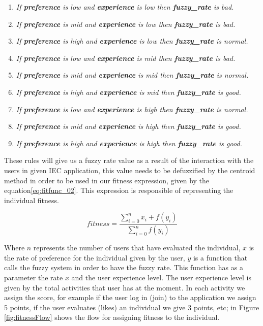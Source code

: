 \begin{enumerate}
	\item \textit{If \textbf{preference} is low and
		\textbf{experience} is low then \textbf{fuzzy\_rate} is bad.}
	\item \textit{If \textbf{preference} is mid and
		\textbf{experience} is low then \textbf{fuzzy\_rate} is bad.}
	\item \textit{If \textbf{preference} is high and
		\textbf{experience} is low then \textbf{fuzzy\_rate} is normal.}
	\item \textit{If \textbf{preference} is low and
		\textbf{experience} is mid then \textbf{fuzzy\_rate} is bad.}
	\item \textit{If \textbf{preference} is mid and
		\textbf{experience} is mid then \textbf{fuzzy\_rate} is normal.}
	\item \textit{If \textbf{preference} is high and
		\textbf{experience} is mid then \textbf{fuzzy\_rate} is good.}
	\item \textit{If \textbf{preference} is low and
		\textbf{experience} is high then \textbf{fuzzy\_rate} is normal.}
	\item \textit{If \textbf{preference} is mid and
		\textbf{experience} is high then \textbf{fuzzy\_rate} is good.}
	\item \textit{If \textbf{preference} is high and
		\textbf{experience} is high then \textbf{fuzzy\_rate} is good.}

\end{enumerate}

These rules will give us a fuzzy rate value as a result of the interaction with
the users in given IEC application, this value needs to be defuzzified by the
centroid method in order to be used in our fitness expression, given by the
equation\ref{eq:fitfunc_02}. This expression is responsible of representing the
individual fitness.

\begin{equation}\label{eq:fitfunc_02}
\displaystyle fitness=\frac{\sum_{i=0}^{n}x_{i}+f(y_{i})}{\sum_{i=0}^{n}f(y_{i})}
\end{equation}

Where $n$ represents the number of users that have evaluated the
individual, $x$ is the rate of preference for the individual given by the user,
$y$ is a function that calls the fuzzy system in order to have the fuzzy rate.
This function has as a parameter the rate $x$ and the user experience level.
The user experience level
is given by the total activities that user has at the moment. In each
activity we assign the score, for example if the user log in (join) to the
application we assign 5 points, if the user evaluates (likes) an individual we
give 3 points, etc; in Figure \ref{fig:fitnessFlow} shows the flow for assigning fitness to
the individual.

